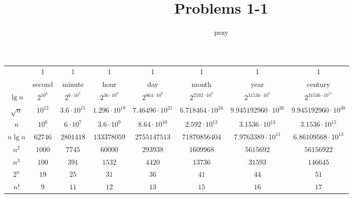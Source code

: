 \documentclass{article}
\begin{document}
	\title{Problems 1-1}
	\author{pezy}
	\maketitle
	\begin{tabular}{ c | c | c | c | c | c | c | c | }
		  & 1 & 1 & 1 & 1 & 1 & 1 & 1 \\
		  & second & minute & hour & day & month & year & century \\ \hline
		$\lg n$ & $2^{10^6}$ & $2^{6\cdot10^7}$ & $2^{36\cdot10^8}$ & $2^{864\cdot10^8}$ & $2^{2592\cdot10^9}$ & $2^{31536\cdot10^9}$ & $2^{31536\cdot10^{11}}$ \\ \hline
		$\sqrt{n}$ & $10^{12}$ & $3.6\cdot10^{15}$ & $1.296\cdot10^{19}$ & $7.46496\cdot10^{21}$ & $6.718464\cdot10^{24}$ & $9.945192960\cdot10^{26}$ & $9.945192960\cdot10^{30}$ \\ \hline
		$n$ & $10^6$ & $6\cdot10^7$ & $3.6\cdot10^9$ & $8.64\cdot10^{10}$ & $2.592\cdot10^{12}$ & $3.1536\cdot10^{13}$ & $3.1536\cdot10^{15}$ \\ \hline
		$n \lg n$ & $62746$ & $2801418$ & $133378059$ & $2755147513$ & $71870856404$ & $7.9763389\cdot10^{11}$ & $6.86109568\cdot10^{13}$ \\ \hline
		$n^2$ & $1000$ & $7745$ & $60000$ & $293938$ & $1609968$ & $5615692$ & $56156922$ \\ \hline
		$n^3$ & $100$ & $391$ & $1532$ & $4420$ & $13736$ & $31593$ & $146645$ \\ \hline
		$2^n$ & $19$ & $25$ & $31$ & $36$ & $41$ & $44$ & $51$ \\ \hline
		$n!$ & $9$ & $11$ & $12$ & $13$ & $15$ & $16$ & $17$ \\ \hline
	\end{tabular}
\end{document}
